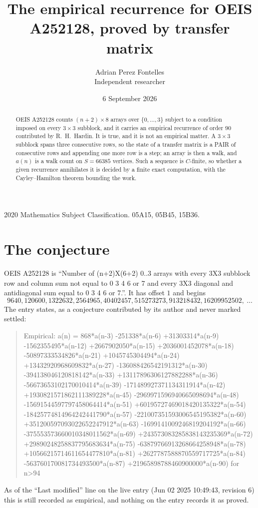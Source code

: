 \documentclass[11pt,a4paper]{article}
\title{The empirical recurrence for OEIS A252128, proved by transfer matrix}
\author{Adrian Perez Fontelles\\ \small Independent researcher}
\date{6 September 2026}
\theoremstyle{plain}
\theoremstyle{definition}
\begin{document}
\maketitle

\begin{abstract}
OEIS A252128 counts $(n+2)\times8$ arrays over $\{0,\dots,3\}$ subject to a condition imposed on
every $3\times3$ subblock, and it carries an empirical recurrence of order $90$
contributed by R.~H.~Hardin. It is true, and it is not an empirical matter. A $3\times3$
subblock spans three consecutive rows, so the state of a transfer matrix is a PAIR of
consecutive rows and appending one more row is a step; an array is then a walk, and
$a(n)$ is a walk count on $S=66385$ vertices. Such a sequence is $C$-finite, so whether a given
recurrence annihilates it is decided by a finite exact computation, with the Cayley--Hamilton
theorem bounding the work.
\end{abstract}

\noindent\small 2020 Mathematics Subject Classification. 05A15, 05B45, 15B36.\normalsize

\section{The conjecture}

OEIS A252128 is ``Number of (n+2)X(6+2) 0..3 arrays with every 3X3 subblock row and column sum not equal to 0 3 4 6 or 7 and every 3X3 diagonal and antidiagonal sum equal to 0 3 4 6 or 7.''. It has offset $1$ and begins
\[
9640, 120600, 1322632, 2564965, 40402457, 515273273, 913218432, 16209952502,\ \dots
\]
The entry states, as a conjecture contributed by its author and never marked settled:
\begin{quote}
Empirical: a(n) = 868*a(n-3) -251338*a(n-6) +31303314*a(n-9) -1562355495*a(n-12) +2667902050*a(n-15) +2036001452078*a(n-18) -50897333534826*a(n-21) +1045745304494*a(n-24) +13432920968609832*a(n-27) -136088426542191312*a(n-30) -394138046120818142*a(n-33) +13117896306127882288*a(n-36) -56673653102170010414*a(n-39) -171489927371134311914*a(n-42) +1930821571862111389228*a(n-45) -2969971596940665098694*a(n-48) -15691544597797458064414*a(n-51) +60195727469018420135322*a(n-54) -18425774814964242441790*a(n-57) -221007351593006545195382*a(n-60) +351200597093022652247912*a(n-63) -1699141009246819204192*a(n-66) -375553573660010348011562*a(n-69) +243573083285838143235369*a(n-72) +29890248258837795683634*a(n-75) -63879766913268664258948*a(n-78) +10566215714611654477810*a(n-81) +2627787588870559717725*a(n-84) -563760170081734493500*a(n-87) +21965898788460900000*a(n-90) for n>94
\end{quote}
As of the ``Last modified'' line on the live entry (Jun 02 2025 10:49:43, revision 6) this is still
recorded as empirical, and nothing on the entry records it as proved.
\end{document}
